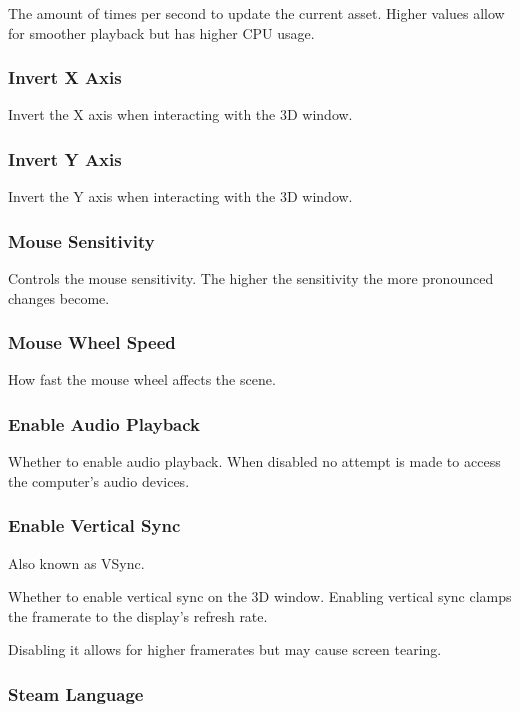 \documentclass[10pt, a4paper, titlepage, oneside]{article}
\begin{document}
The amount of times per second to update the current asset. Higher values allow for smoother playback but has higher CPU usage.

\newpage

\subsubsection{Invert X Axis}

Invert the X axis when interacting with the 3D window.

\subsubsection{Invert Y Axis}

Invert the Y axis when interacting with the 3D window.

\subsubsection{Mouse Sensitivity}

Controls the mouse sensitivity. The higher the sensitivity the more pronounced changes become.

\subsubsection{Mouse Wheel Speed}

How fast the mouse wheel affects the scene.

\subsubsection{Enable Audio Playback}

Whether to enable audio playback. When disabled no attempt is made to access the computer's audio devices.

\subsubsection{Enable Vertical Sync}

Also known as VSync.

Whether to enable vertical sync on the 3D window. Enabling vertical sync clamps the framerate to the display's refresh rate.

Disabling it allows for higher framerates but may cause screen tearing.

\subsubsection{Steam Language}
\end{document}
